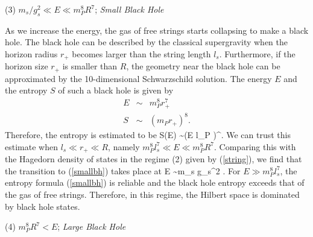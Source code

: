 \medskip
\noindent
(3) $m_s/g_s^2  \ll E \ll m_P^8 R^7$; {\it Small Black Hole}

\smallskip

As we increase the energy, the gas of free strings starts
collapsing to make a black hole. The black hole can be described
by the classical supergravity when the horizon radius $r_+$ 
becomes larger than the string length $l_s$. Furthermore, if the
horizon size $r_+$ is smaller than $R$,
the geometry near the black hole can be approximated by the 10-dimensional
Schwarzschild solution. The energy $E$ and the entropy $S$ of such
a black hole is given by
\begin{eqnarray}
   E &\sim &   m_P^8 r_+^7 
\nonumber \\
  S & \sim & (m_P r_+)^8.
\label{tendformula}
\end{eqnarray}
Therefore, the entropy is estimated to be
\beq
    S(E) \sim  (E l_P )^{}.
\label{smallbh}
\eeq
We can trust this estimate when $l_s \ll r_+ \ll R$,
namely $m_P^8 l_s^7 \ll E \ll m_P^8 R^7$.
Comparing this with the Hagedorn density of states
in the regime (2) given by (\ref{string}), we find that 
the transition to (\ref{smallbh}) takes place at
\beq
 E \sim {m_s \over g_s^2} .
\eeq
For $E \gg m_P^8 l_s^7$, the entropy formula
(\ref{smallbh}) is reliable and the black hole
entropy exceeds that of the gas of free strings. 
Therefore, in this regime, the Hilbert space
is dominated by black hole states. 

\medskip
\noindent
(4) $m_P^8 R^7 < E$; {\it Large Black Hole}

